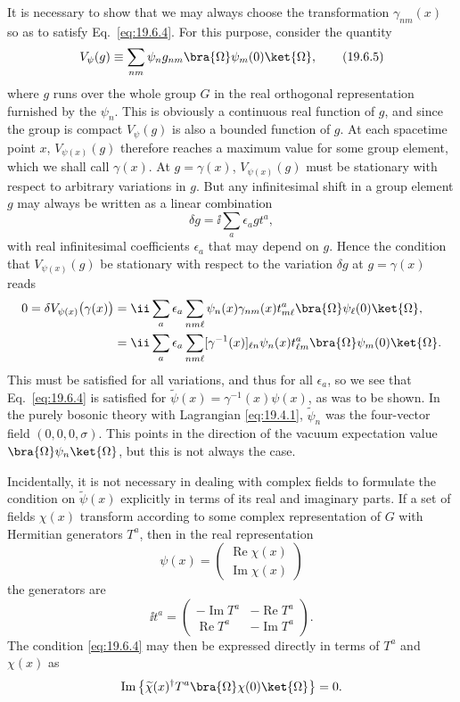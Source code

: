 It is necessary to show that we may always choose the transformation $\gamma_{nm}(x)$ so as to satisfy Eq.~\eqref{eq:19.6.4}. For this purpose, consider the quantity
\begin{equation}
V_\psi(g)\equiv
\sum_{nm}\psi_n g_{nm}\bra{\Omega}\psi_m(0)\ket{\Omega},
\tag{19.6.5}\label{eq:19.6.5}
\end{equation}
where $g$ runs over the whole group $G$ in the real orthogonal representation furnished by the $\psi_n$. This is obviously a continuous real function of $g$, and since the group is compact $V_\psi(g)$ is also a bounded function of $g$. At each spacetime point $x$, $V_{\psi(x)}(g)$ therefore reaches a maximum value for some group element, which we shall call $\gamma(x)$. At $g=\gamma(x)$, $V_{\psi(x)}(g)$ must be stationary with respect to arbitrary variations in $g$. But any infinitesimal shift in a group element $g$ may always be written as a linear combination
\[
\delta g=\ii\sum_a\epsilon_a g t^a,
\]
with real infinitesimal coefficients $\epsilon_a$ that may depend on $g$. Hence the condition that $V_{\psi(x)}(g)$ be stationary with respect to the variation $\delta g$ at $g=\gamma(x)$ reads
\[
\begin{aligned}
0=\delta V_{\psi(x)}\bigl(\gamma(x)\bigr)
&=\ii\sum_a\epsilon_a
\sum_{nm\ell}\psi_n(x)\gamma_{nm}(x)t^a_{m\ell}
\bra{\Omega}\psi_\ell(0)\ket{\Omega},
\\
&=\ii\sum_a\epsilon_a
\sum_{nm\ell}[\gamma^{-1}(x)]_{\ell n}\psi_n(x)t^a_{\ell m}
\bra{\Omega}\psi_m(0)\ket{\Omega}.
\end{aligned}
\]
This must be satisfied for all variations, and thus for all $\epsilon_a$, so we see that Eq.~\eqref{eq:19.6.4} is satisfied for $\widetilde\psi(x)=\gamma^{-1}(x)\psi(x)$, as was to be shown. In the purely bosonic theory with Lagrangian \eqref{eq:19.4.1}, $\widetilde\psi_n$ was the four-vector field $(0,0,0,\sigma)$. This points in the direction of the vacuum expectation value $\bra{\Omega}\psi_n\ket{\Omega}$, but this is not always the case.

Incidentally, it is not necessary in dealing with complex fields to formulate the condition on $\widetilde\psi(x)$ explicitly in terms of its real and imaginary parts. If a set of fields $\chi(x)$ transform according to some complex representation of $G$ with Hermitian generators $T^a$, then in the real representation
\[
\psi(x)=
\begin{pmatrix}
\operatorname{Re}\chi(x)\\
\operatorname{Im}\chi(x)
\end{pmatrix}
\]
the generators are
\[
\ii t^a=
\begin{pmatrix}
-\operatorname{Im}T^a&-\operatorname{Re}T^a\\
\operatorname{Re}T^a&-\operatorname{Im}T^a
\end{pmatrix}.
\]
The condition \eqref{eq:19.6.4} may then be expressed directly in terms of $T^a$ and $\chi(x)$ as
\[
\operatorname{Im}\left\{
\widetilde\chi(x)^\dagger T^a
\bra{\Omega}\chi(0)\ket{\Omega}
\right\}=0.
\]

